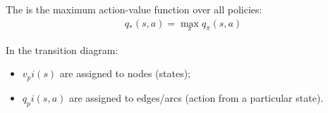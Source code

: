 The   is the maximum action-value function over all policies:
\begin{align*}
	q_*(s, a) = \max_{\pi} q_{\pi}(s, a)
\end{align*}


\begin{notebox}
	In the transition diagram:
	\begin{itemize}
		\item $v_pi(s)$ are assigned to nodes (states);
		\item $q_pi(s, a)$ are assigned to edges/arcs (action from a particular state).
	\end{itemize}
\end{notebox}
